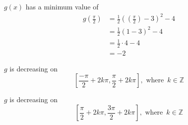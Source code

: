 \documentclass{ximera}
\begin{document}
$g(x)$ has a minimum value of
\begin{align*}
g\left( \frac{\pi}{2} \right) &= \frac{1}{2} \left(\left( \frac{\pi}{2} \right) - 3 \right)^2 - 4 \\
                               &= \frac{1}{2} (1 - 3)^2 - 4 \\
                               &= \frac{1}{2} \cdot 4 - 4 \\
                               &=  -2
\end{align*}



$g$ is decreasing on 
\[
\left[ \frac{-\pi}{2} + 2k\pi, \frac{\pi}{2} + 2k\pi \right], \text{ where } \,  k \in \mathbb{Z}
\]




$g$ is decreasing on 
\[
\left[ \frac{\pi}{2} + 2k\pi, \frac{3\pi}{2} + 2k\pi \right], \text{ where } \,  k \in \mathbb{Z}
\]
\end{document}
